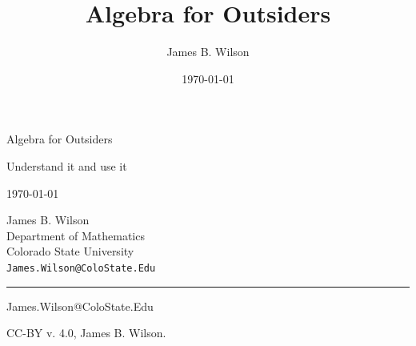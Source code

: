 \documentclass[12pt,twoside,letterpaper]{memoir}
\begin{document}
\author{James B. Wilson}
\title{Algebra for Outsiders}
\date{\today}

      \begin{minipage}{\textwidth}
      \noindent
      {\titlefont Algebra for Outsiders}\par
      \epigraph{Understand it and use it}%
      {\today}
      \null\vfill
      \vspace*{1cm}
      \noindent
      \hfill
      \begin{minipage}{0.35\linewidth}
            \begin{flushright}
            James B. Wilson \vspace{50pt}\\
            Department of Mathematics \\
            Colorado State University\vspace{100pt} \\
            {\small \texttt{James.Wilson@ColoState.Edu}}\vspace{20pt} \\      
            \end{flushright}
      \end{minipage}
      \begin{minipage}{0.02\linewidth}
            \rule{1pt}{125pt}
      \end{minipage}
      \titlepagedecoration
      \end{minipage}

      \thispagestyle{empty}
      \newpage\thispagestyle{empty}





\vspace*{\fill}


\vspace*{\fill}\thispagestyle{empty}


\frontmatter%


\vspace*{\fill}

\bigskip
James.Wilson@ColoState.Edu
\bigskip

\noindent CC-BY v. 4.0, James B. Wilson.  
\end{document}
